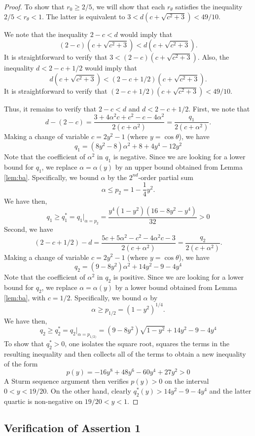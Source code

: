 \documentclass[12pt]{icgft}
\theoremstyle{definition}
\numberwithin{equation}{section}
\begin{document}
\begin{proof}
To show that $r_0 \ge 2/5$, we will show that each $r_\theta$ satisfies the inequality
$2/5 < r_\theta < 1$.  The latter is equivalent to $3 < d(c+\sqrt{c^2+3}) < 49/10$.

We note that the inequality $2-c < d$ would imply that
$$(2-c)(c+\sqrt{c^2+3}) < d(c+\sqrt{c^2+3}).$$
\noindent It is straightforward to verify that $3 < (2-c)(c+\sqrt{c^2+3})$.
Also, the inequality $d < 2-c + 1/2$ would imply that
$$d(c+\sqrt{c^2+3}) < (2-c + 1/2)(c+\sqrt{c^2+3}).$$
\noindent It is straightforward to verify that $(2-c + 1/2)(c+\sqrt{c^2+3}) < 49/10$.

Thus, it remains to verify that $2-c < d$ and $d < 2-c + 1/2$.  First, we note  that
$$ d-(2-c) = \frac{3+4\alpha^2c+c^2-c-4\alpha^2}{2(c+\alpha^2)} = \frac{q_1}{2(c+\alpha^2)} .$$
Making a change of variable $c = 2y^2-1$ (where $y = \cos \theta$), we have
$$q_1= (8y^2-8)\alpha^2 +8 + 4y^4 - 12y^2$$
Note that the coefficient of $\alpha^2$ in $q_1$ is negative.  Since we are looking for a lower bound for $q_1$, we replace $\alpha =
\alpha(y)$ by an upper bound obtained from Lemma \ref{lem:ba}.  Specifically, we bound $\alpha$ by the $2^{nd}$-order partial sum
$$\alpha \le p_2 = 1 - \frac{1}{4}y^2 .$$
We have then,
$$q_1 \ge q_1^* = {q_1}|_{\alpha=p_2} = \frac{y^4(1-y^2)(16-8y^2-y^4)}{32} > 0$$
Second, we have
$$ (2-c + 1/2) - d = \frac{5c + 5\alpha^2 -c^2 - 4\alpha^2 c -3}{2(c+\alpha^2)} = \frac{q_2}{2(c+\alpha^2)} .$$
Making a change of variable $c = 2y^2-1$ (where $y = \cos \theta$), we have
$$q_2= (9-8y^2)\alpha^2 + 14y^2 - 9 - 4y^4$$
Note that the coefficient of $\alpha^2$ in $q_2$ is positive.  Since we are looking for a lower bound for $q_2$, we replace $\alpha =
\alpha(y)$ by a lower bound obtained from Lemma \ref{lem:ba}, with $c=1/2$.  Specifically, we bound $\alpha$ by
$$\alpha \ge p_{1/2} = (1-y^2)^{1/4} .$$
We have then,
$$q_2 \ge q_2^* = {q_2}|_{\alpha=p_{1/2)}} =  (9-8y^2)\sqrt{1-y^2} + 14y^2 - 9 - 4y^4$$
To show that $q_2^* > 0$, one isolates the square root, squares the terms in the resulting inequality and then collects all of the terms to obtain a new inequality of the form
$$p(y) = -16y^8+48y^6-60y^4+27y^2 > 0$$
\noindent A Sturm sequence argument then verifies $p(y) > 0$ on the interval $0 < y < 19/20$.
On the other hand, clearly $q_2^*(y) > 14y^2 - 9 - 4y^4$ and the latter quartic is non-negative on $19/20 < y < 1$.
\end{proof}

\subsection{Verification of Assertion 1}
\end{document}
